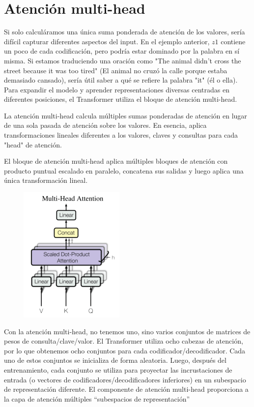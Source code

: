         
\section{Atención multi-head}

Si solo calculáramos una única suma ponderada de atención de los valores, sería difícil capturar diferentes aspectos del input. En el ejemplo anterior, $z1$ contiene un poco de cada codificación, pero podría estar dominado por la palabra en sí misma.
Si estamos traduciendo una oración como "The animal didn't cross the street because it was too tired" (El animal no cruzó la calle porque estaba demasiado cansado), sería útil saber a qué se refiere la palabra "it" (él o ella).  Para expandir el modelo y aprender representaciones diversas centradas en diferentes posiciones, el Transformer utiliza el bloque de atención multi-head.

La atención multi-head calcula múltiples sumas ponderadas de atención en lugar de una sola pasada de atención sobre los valores. En esencia, aplica transformaciones lineales diferentes a los valores, claves y consultas para cada "head" de atención.

El bloque de atención multi-head aplica múltiples bloques de atención con producto puntual escalado en paralelo, concatena sus salidas y luego aplica una única transformación lineal.

\begin{figure}[h]
  \centering
  \includegraphics[scale=0.48]{pics/multi_head_attention.png}
\end{figure}

Con la atención multi-head, no tenemos uno, sino varios conjuntos de matrices de pesos de consulta/clave/valor. El Transformer utiliza ocho cabezas de atención, por lo que obtenemos ocho conjuntos para cada codificador/decodificador. Cada uno de estos conjuntos se inicializa de forma aleatoria. Luego, después del entrenamiento, cada conjunto se utiliza para proyectar las incrustaciones de entrada (o vectores de codificadores/decodificadores inferiores) en un subespacio de representación diferente. El componente de atención multi-head proporciona a la capa de atención múltiples ``subespacios de representación''


